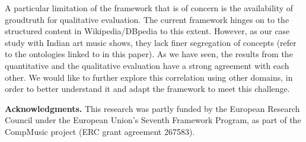 \documentclass{llncs}
\begin{document}
A particular limitation of the framework that is of concern is the availability of groudtruth for qualitative evaluation. The current framework hinges on to the structured content in Wikipedia/DBpedia to this extent. However, as our case study with Indian art music shows, they lack finer segregation of concepts (refer to the ontologies linked to in this paper). As we have seen, the results from the quantitative and the qualitative evaluation have a strong agreement with each other. We would like to further explore this correlation using other domains, in order to better understand it and adapt the framework to meet this challenge.

\medskip
\noindent
\textbf{Acknowledgments.} This research was partly funded by the European Research Council under the European Union's Seventh Framework Program, as part of the CompMusic project (ERC grant agreement 267583).

\renewcommand\bibname{References}
{\fontsize{9}{10}\selectfont
\footnotesize


}
\end{document}
